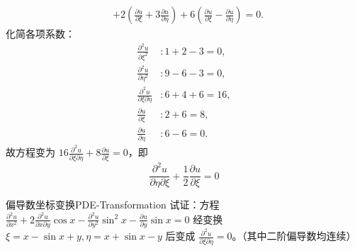 \begin{myproof}
\begin{equation}
\begin{aligned}
             & + 2 \left( \frac{\partial u}{\partial \xi} + 3 \frac{\partial u}{\partial \eta} \right) + 6 \left( \frac{\partial u}{\partial \xi} - \frac{\partial u}{\partial \eta} \right) = 0.
        \end{aligned}
    \end{equation}
    化简各项系数：
    \begin{equation}
        \begin{aligned}
            \frac{\partial^2 u}{\partial \xi^2}             & : 1 + 2 - 3 = 0,  \\
            \frac{\partial^2 u}{\partial \eta^2}            & : 9 - 6 - 3 = 0,  \\
            \frac{\partial^2 u}{\partial \xi \partial \eta} & : 6 + 4 + 6 = 16, \\
            \frac{\partial u}{\partial \xi}                 & : 2 + 6 = 8,      \\
            \frac{\partial u}{\partial \eta}                & : 6 - 6 = 0.
        \end{aligned}
    \end{equation}
    故方程变为 $16 \frac{\partial^2 u}{\partial \xi \partial \eta} + 8 \frac{\partial u}{\partial \xi} = 0$，即
    \begin{equation}
        \boxed{\frac{\partial^2 u}{\partial \eta \partial \xi} + \frac{1}{2} \frac{\partial u}{\partial \xi} = 0}
    \end{equation}
\end{myproof}


\begin{problem}{偏导数坐标变换}{PDE-Transformation}
    试证：方程 $\frac{\partial^2 u}{\partial x^2} + 2 \frac{\partial^2 u}{\partial x \partial y} \cos x - \frac{\partial^2 u}{\partial y^2} \sin^2 x - \frac{\partial u}{\partial y} \sin x = 0$ 经变换 $\xi = x - \sin x + y, \eta = x + \sin x - y$ 后变成 $\frac{\partial^2 u}{\partial \xi \partial \eta} = 0$。（其中二阶偏导数均连续）
\end{problem}

